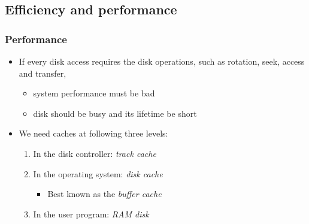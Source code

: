 \documentclass[CJKutf8,xcolor=pdftex,dvipsnames,table]{beamer}
\begin{document}
\begin{CJK*}{UTF8}{song}
  \subsection{Efficiency and performance}
  
  \begin{frame}
    \frametitle{Performance} \pause
    \begin{itemize}\parskip=0pt
    \item If every disk access requires the disk operations, such as rotation, seek, access and transfer, \pause
      \begin{itemize}\parskip=0pt
      \item system performance must be bad \pause
      \item disk should be busy and its lifetime be short \pause
      \end{itemize}
    \item We need caches at following three levels: \pause
      \begin{enumerate}\parskip=0pt
      \item In the disk controller: \emph{track cache} \pause
      \item In the operating system: \emph{disk cache} \pause
        \begin{itemize}\parskip=0pt
        \item Best known as the \emph{buffer cache} \pause
        \end{itemize}
      \item In the user program: \emph{RAM disk}
      \end{enumerate}
    \end{itemize}
  \end{frame}
  

\end{CJK*}
\end{document}
